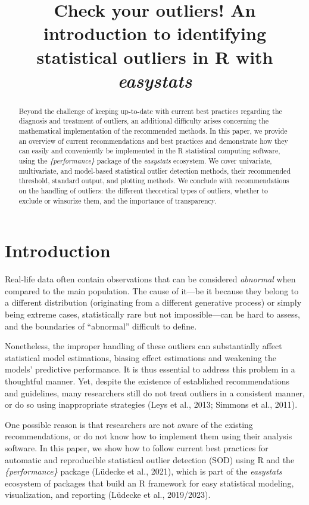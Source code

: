 \documentclass{article}
\title{Check your outliers! An introduction to identifying statistical
outliers in R with \emph{easystats}}
\author{
  }
\begin{document}
\maketitle


\begin{abstract}
Beyond the challenge of keeping up-to-date with current best practices
regarding the diagnosis and treatment of outliers, an additional
difficulty arises concerning the mathematical implementation of the
recommended methods. In this paper, we provide an overview of current
recommendations and best practices and demonstrate how they can easily
and conveniently be implemented in the R statistical computing software,
using the \emph{\{performance\}} package of the \emph{easystats}
ecosystem. We cover univariate, multivariate, and model-based
statistical outlier detection methods, their recommended threshold,
standard output, and plotting methods. We conclude with recommendations
on the handling of outliers: the different theoretical types of
outliers, whether to exclude or winsorize them, and the importance of
transparency.
\end{abstract}


\hypertarget{introduction}{%
\section{Introduction}\label{introduction}}

Real-life data often contain observations that can be considered
\emph{abnormal} when compared to the main population. The cause of
it---be it because they belong to a different distribution (originating
from a different generative process) or simply being extreme cases,
statistically rare but not impossible---can be hard to assess, and the
boundaries of ``abnormal'' difficult to define.

Nonetheless, the improper handling of these outliers can substantially
affect statistical model estimations, biasing effect estimations and
weakening the models' predictive performance. It is thus essential to
address this problem in a thoughtful manner. Yet, despite the existence
of established recommendations and guidelines, many researchers still do
not treat outliers in a consistent manner, or do so using inappropriate
strategies (Leys et al., 2013; Simmons et al., 2011).

One possible reason is that researchers are not aware of the existing
recommendations, or do not know how to implement them using their
analysis software. In this paper, we show how to follow current best
practices for automatic and reproducible statistical outlier detection
(SOD) using R and the \emph{\{performance\}} package (Lüdecke et al.,
2021), which is part of the \emph{easystats} ecosystem of packages that
build an R framework for easy statistical modeling, visualization, and
reporting (Lüdecke et al., 2019/2023).
\end{document}
